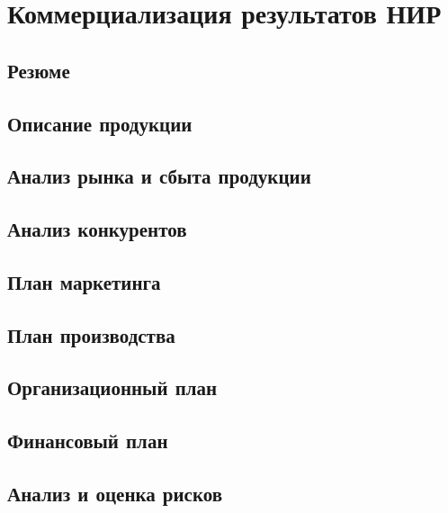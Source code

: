 \chapter{Коммерциализация результатов НИР}
\section{Резюме}

\section{Описание продукции}

\section{Анализ рынка и сбыта продукции}

\section{Анализ конкурентов}

\section{План маркетинга}

\section{План производства}

\section{Организационный план}

\section{Финансовый план}

\section{Анализ и оценка рисков}







